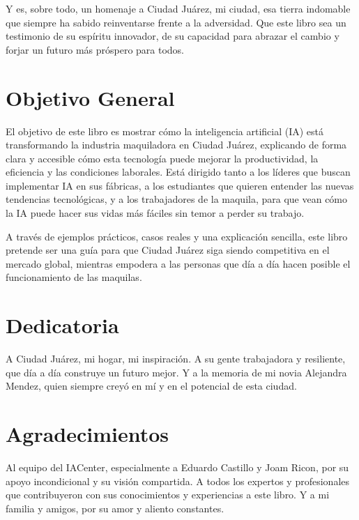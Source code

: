 \documentclass[
  10pt,
  letterpaper,
]{book}
\begin{document}
Y es, sobre todo, un homenaje a Ciudad Juárez, mi ciudad, esa tierra
indomable que siempre ha sabido reinventarse frente a la adversidad. Que
este libro sea un testimonio de su espíritu innovador, de su capacidad
para abrazar el cambio y forjar un futuro más próspero para todos.

\section*{Objetivo General}\label{objetivo-general}


El objetivo de este libro es mostrar cómo la inteligencia artificial
(IA) está transformando la industria maquiladora en Ciudad Juárez,
explicando de forma clara y accesible cómo esta tecnología puede mejorar
la productividad, la eficiencia y las condiciones laborales. Está
dirigido tanto a los líderes que buscan implementar IA en sus fábricas,
a los estudiantes que quieren entender las nuevas tendencias
tecnológicas, y a los trabajadores de la maquila, para que vean cómo la
IA puede hacer sus vidas más fáciles sin temor a perder su trabajo.

A través de ejemplos prácticos, casos reales y una explicación sencilla,
este libro pretende ser una guía para que Ciudad Juárez siga siendo
competitiva en el mercado global, mientras empodera a las personas que
día a día hacen posible el funcionamiento de las maquilas.

\section*{Dedicatoria}\label{dedicatoria}


A Ciudad Juárez, mi hogar, mi inspiración. A su gente trabajadora y
resiliente, que día a día construye un futuro mejor. Y a la memoria de
mi novia Alejandra Mendez, quien siempre creyó en mí y en el potencial
de esta ciudad.

\section*{Agradecimientos}\label{agradecimientos}


Al equipo del IACenter, especialmente a Eduardo Castillo y Joam Ricon,
por su apoyo incondicional y su visión compartida. A todos los expertos
y profesionales que contribuyeron con sus conocimientos y experiencias a
este libro. Y a mi familia y amigos, por su amor y aliento constantes.
\end{document}
